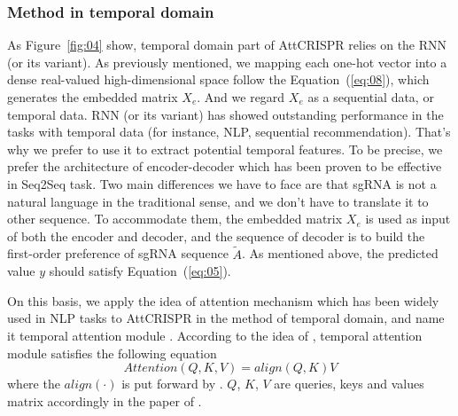 \documentclass{bioinfo}
\begin{document}
\subsubsection{Method in temporal domain}
As Figure~\ref{fig:04} show, temporal domain part of AttCRISPR relies on the RNN (or its variant). 
As previously mentioned, we mapping each one-hot vector into a dense real-valued high-dimensional space follow the Equation~(\ref{eq:08}), which generates the embedded matrix $X_e$.
And we regard $X_{e}$ as a sequential data, or temporal data.
RNN (or its variant) has showed outstanding performance in the tasks with temporal data (for instance, NLP, sequential recommendation). 
That's why we prefer to use it to extract potential temporal features. 
To be precise, we prefer the architecture of encoder-decoder which has been proven to be effective in Seq2Seq task. 
Two main differences we have to face are that sgRNA is not a natural language in the traditional sense, and we don't have to translate it to other sequence. 
To accommodate them, the embedded matrix $X_e$ is used as input of both the encoder and decoder, and the sequence of decoder is to build the first-order preference of sgRNA sequence $\tilde{A}$. 
As mentioned above, the predicted value $y$ should satisfy Equation~(\ref{eq:05}). 

On this basis, we apply the idea of attention mechanism which has been widely used in NLP tasks to AttCRISPR in the method of temporal domain, 
and name it temporal attention module \citep{luong2015effective,vaswani2017attention}.
According to the idea of \citeauthor{vaswani2017attention}, temporal attention module satisfies the following equation
\begin{equation}
Attention(Q,K,V)=align(Q,K)V\label{eq:13}
\end{equation}
where the $align(\cdot)$ is put forward by \citeauthor{luong2015effective}. 
$Q$, $K$, $V$ are queries, keys and values matrix accordingly in the paper of \citeauthor{vaswani2017attention}. 
\end{document}
